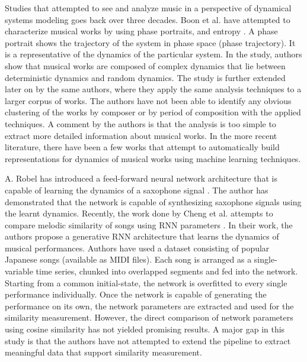 \documentclass[../main.tex]{subfiles}
\begin{document}
\par
Studies that attempted to see and analyze music in a perspective of dynamical systems modeling goes back over three decades. Boon et al. have attempted to characterize musical works by using phase portraits, and entropy \cite{complex_dynamics}. A phase portrait shows the trajectory of the system in phase space (phase trajectory). It is a representative of the dynamics of the particular system. In the study,  authors show that musical works are composed of complex dynamics that lie between deterministic dynamics and random dynamics. The study is further extended later on by the same authors\cite{boonDynamicalSystemsTheory1995}, where they apply the same analysis techniques to a larger corpus of works. The authors have not been able to identify any obvious clustering of the works by composer or by period of composition with the applied techniques. A comment by the authors is that the analysis is too simple to extract more detailed information about musical works. In the more recent literature, there have been a few works that attempt to automatically build representations for dynamics of musical works using machine learning techniques.

\par
A. Robel has introduced a feed-forward neural network architecture that is capable of learning the dynamics of a saxophone signal \cite{robelNeuralNetworkModeling1997}. The author has demonstrated that the network is capable of synthesizing saxophone signals using the learnt dynamics. Recently, the work done by Cheng et al. attempts to compare melodic similarity of songs using \gls{RNN} parameters \cite{tian_cheng_comparing_2018}. In their work, the authors propose a generative \gls{RNN} architecture that learns the dynamics of  musical performances. Authors have used a dataset consisting of popular Japanese songs (available as MIDI files). Each song is arranged as a single-variable time series, chunked into overlapped segments and fed into the network. Starting from a common initial-state, the network is overfitted to every single performance individually. Once the network is capable of generating the performance on its own, the network parameters are extracted and used for the similarity measurement. However, the direct comparison of network parameters using cosine similarity has not yielded promising results. A major gap in this study is that the authors have not attempted to extend the pipeline to extract meaningful data that support similarity measurement.
\end{document}
